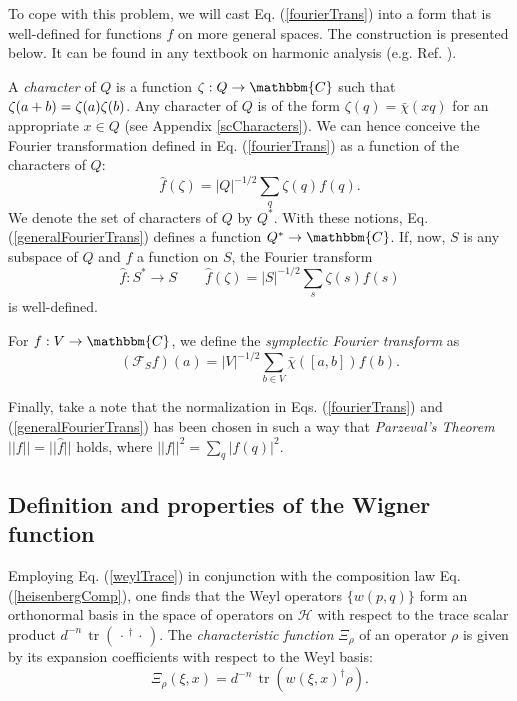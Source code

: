 \documentclass[aps,twocolumn,floatfix]{revtex4}
\def\CC{\mathbbm{C}}
\def\H{\mathcal{H}}
\def\Fou{\mathcal{F}}
\def\spacedot{\,\cdot\,}
\DeclareMathOperator{\tr}{tr}
\begin{document}
To cope with this problem, we will cast Eq.  (\ref{fourierTrans}) into
a form that is well-defined for functions $f$ on more general spaces.
The construction is presented below.  It can be found in any textbook
on harmonic analysis (e.g.  Ref. \cite{harmonictextbook}).

A \emph{character} of $Q$ is a function $\zeta: Q\to \CC$ such that
$\nolinebreak{\zeta(a+b)}=\zeta(a)\zeta(b)$. Any character of $Q$ is
of the form $\zeta(q)=\bar\chi(xq)$ for an appropriate $x\in Q$ (see
Appendix \ref{scCharacters}). We can hence conceive the Fourier
transformation defined in Eq. (\ref{fourierTrans}) as a function of
the characters of $Q$:
\begin{equation}\label{generalFourierTrans}
	\hat f(\zeta) = |Q|^{-1/2} \sum_q \zeta(q) f(q).
\end{equation}
We denote the set of characters of $Q$ by $Q^*$. With these notions, Eq.
(\ref{generalFourierTrans}) defines a function $Q^* \to \CC$. If, now,
$S$ is any subspace of $Q$ and $f$ a function on $S$, the Fourier
transform
\begin{equation*}
	\hat f: S^* \to S \quad\quad 
	\hat f(\zeta)=|S|^{-1/2} \sum_s \zeta(s) f(s)
\end{equation*}
is well-defined.

For $f: V\to\CC$, we define the \emph{symplectic Fourier
transform} as
\begin{equation}
	(\Fou_S f)(a)
	= |V|^{-1/2} \sum_{b\in V} \bar\chi([a,b]) f(b).
\end{equation}

Finally, take a note that the normalization in Eqs.
(\ref{fourierTrans}) and (\ref{generalFourierTrans}) has been
chosen in such a way that \emph{Parzeval's Theorem} $||f||=||\hat f||$
holds, where $||f||^2=\sum_q |f(q)|^2$.

\subsection{Definition and properties of the Wigner function}
\label{scWigner}

Employing Eq. (\ref{weylTrace}) in conjunction with the composition
law Eq. (\ref{heisenbergComp}), one finds that the Weyl operators
$\{w(p,q)\}$ form an orthonormal basis in the space of operators on
$\H$ with respect to the trace scalar product
$d^{-n}\,\tr(\spacedot^\dagger\spacedot)$. The \emph{characteristic
function} $\Xi_\rho$ of an operator $\rho$ is given by its expansion
coefficients with respect to the Weyl basis:
\begin{equation}
	\Xi_\rho(\xi,x)=d^{-n}\, \tr(w(\xi,x)^\dagger \rho).
\end{equation}
\end{document}
